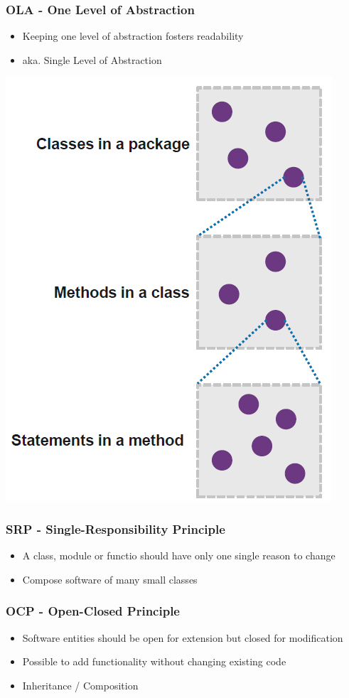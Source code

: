 \subsubsection{OLA - One Level of Abstraction}
\begin{itemize}
    \item Keeping one level of abstraction fosters readability
    \item aka. Single Level of Abstraction
\end{itemize}
\includegraphics[width=0.5\linewidth]{../img/OLA.png}

\subsubsection{SRP - Single-Responsibility Principle}
\begin{itemize}
    \item A class, module or functio should have only one single reason to change
    \item Compose software of many small classes
\end{itemize}

\subsubsection{OCP - Open-Closed Principle}
\begin{itemize}
    \item Software entities should be open for extension but closed for modification
    \item Possible to add functionality without changing existing code
    \item Inheritance / Composition
\end{itemize}

